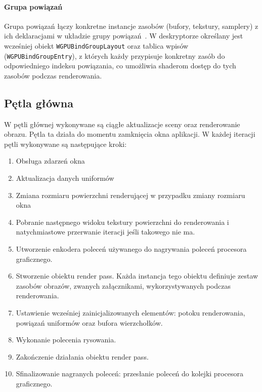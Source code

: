 \paragraph{Grupa powiązań}
Grupa powiązań łączy konkretne instancje zasobów (bufory, tekstury, samplery) z ich deklaracjami w układzie grupy powiązań~\cite{WebGPU-draft}. W deskryptorze określany jest wcześniej obiekt \texttt{WGPUBindGroupLayout} oraz tablica wpisów (\texttt{WGPUBindGroupEntry}), z których każdy przypisuje konkretny zasób do odpowiedniego indeksu powiązania, co umożliwia shaderom dostęp do tych zasobów podczas renderowania.

\subsection{Pętla główna}
W pętli głównej wykonywane są ciągłe aktualizacje sceny oraz renderowanie obrazu. Pętla ta działa do momentu zamknięcia okna aplikacji. W każdej iteracji pętli wykonywane są następujące kroki:
\begin{enumerate}
  \item Obsługa zdarzeń okna
  \item Aktualizacja danych uniformów
  \item Zmiana rozmiaru powierzchni renderującej w przypadku zmiany rozmiaru okna
  \item Pobranie następnego widoku tekstury powierzchni do renderowania i natychmiastowe przerwanie iteracji jeśli takowego nie ma.
  \item Utworzenie enkodera poleceń używanego do nagrywania poleceń procesora graficznego.
  \item Stworzenie obiektu render pass.
        Każda instancja tego obiektu definiuje zestaw zasobów obrazów, zwanych załącznikami, wykorzystywanych podczas renderowania.
  \item Ustawienie wcześniej zainicjalizowanych elementów: potoku renderowania, powiązań uniformów oraz bufora wierzchołków.
  \item Wykonanie polecenia rysowania.
  \item Zakończenie działania obiektu render pass.
  \item Sfinalizowanie nagranych poleceń: przesłanie poleceń do kolejki procesora graficznego.
\end{enumerate}
